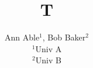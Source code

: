 \documentclass{article}
\begin{document}
\title{T}
\author{Ann Able$^{1}$, Bob Baker$^{2}$ \\ \vspace*{2mm}\noindent $^{1}$Univ A \\ $^{2}$Univ B}
\maketitle
\end{document}
